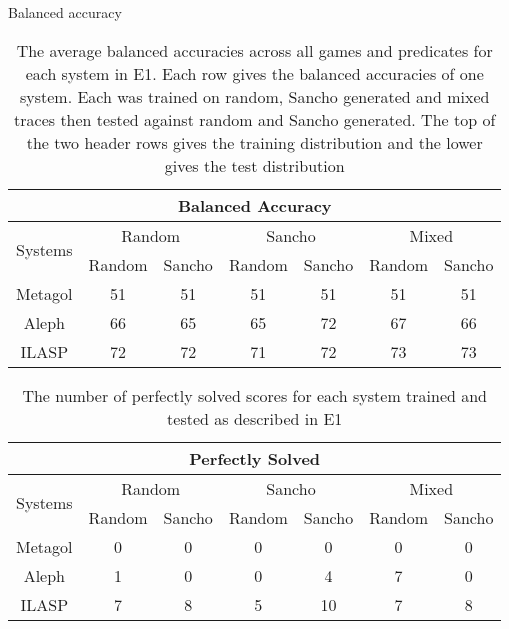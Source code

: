 Balanced accuracy

\begin{table}[]
	\begin{tabular}{|c|c|c|c|c|c|c|}
		\hline
		\multicolumn{7}{|c|}{Balanced Accuracy}                                                                           \\ \hline
		\multirow{2}{*}{Systems} & \multicolumn{2}{c|}{Random} & \multicolumn{2}{c|}{Sancho} & \multicolumn{2}{c|}{Mixed} \\ \cline{2-7}
		& Random       & Sancho       & Random       & Sancho       & Random       & Sancho      \\ \hline
		Metagol                  & 51           & 51           & 51           & 51           & 51           & 51          \\ \hline
		Aleph                    & 66           & 65           & 65           & 72           & 67           & 66          \\ \hline
		ILASP                    & 72           & 72           & 71           & 72           & 73           & 73          \\ \hline
	\end{tabular}
	\label{E1-BA}
	\caption{The average balanced accuracies across all games and predicates for each system in E1. Each row gives the balanced accuracies of one system. Each was trained on random, Sancho generated and mixed traces then tested against random and Sancho generated. The top of the two header rows gives the training distribution and the lower gives the test distribution}
\end{table}


\begin{table}[]
	\begin{tabular}{|c|c|c|c|c|c|c|}
		\hline
		\multicolumn{7}{|c|}{Perfectly Solved}                                                                            \\ \hline
		\multirow{2}{*}{Systems} & \multicolumn{2}{c|}{Random} & \multicolumn{2}{c|}{Sancho} & \multicolumn{2}{c|}{Mixed} \\ \cline{2-7}
		& Random       & Sancho       & Random       & Sancho       & Random       & Sancho      \\ \hline
		Metagol                  & 0            & 0            & 0            & 0            & 0            & 0           \\ \hline
		Aleph                    & 1            & 0            & 0            & 4            & 7            & 0           \\ \hline
		ILASP                    & 7            & 8            & 5            & 10           & 7            & 8           \\ \hline
	\end{tabular}
	\label{E1-P}
	\caption{The number of perfectly solved scores for each system trained and tested as described in E1}
\end{table}

